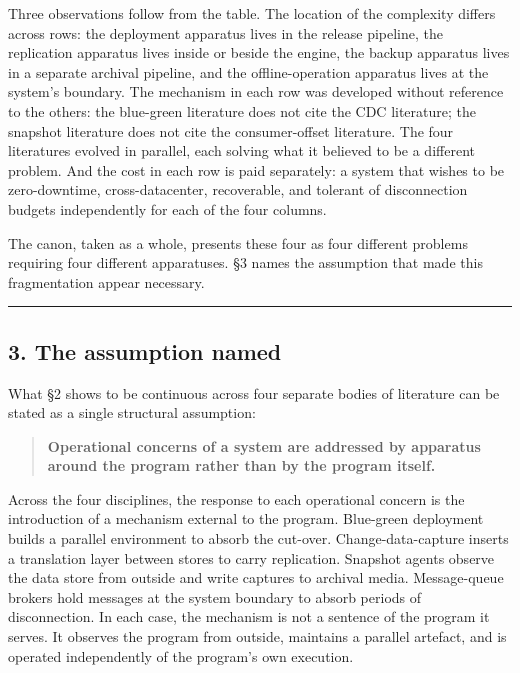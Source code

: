 \documentclass[
]{article}
\begin{document}
Three observations follow from the table. The location of the complexity
differs across rows: the deployment apparatus lives in the release
pipeline, the replication apparatus lives inside or beside the engine,
the backup apparatus lives in a separate archival pipeline, and the
offline-operation apparatus lives at the system's boundary. The
mechanism in each row was developed without reference to the others: the
blue-green literature does not cite the CDC literature; the snapshot
literature does not cite the consumer-offset literature. The four
literatures evolved in parallel, each solving what it believed to be a
different problem. And the cost in each row is paid separately: a system
that wishes to be zero-downtime, cross-datacenter, recoverable, and
tolerant of disconnection budgets independently for each of the four
columns.

The canon, taken as a whole, presents these four as four different
problems requiring four different apparatuses. §3 names the assumption
that made this fragmentation appear necessary.

\begin{center}\rule{0.5\linewidth}{0.5pt}\end{center}

\subsection{3. The assumption named}\label{the-assumption-named}

What §2 shows to be continuous across four separate bodies of literature
can be stated as a single structural assumption:

\begin{quote}
\textbf{Operational concerns of a system are addressed by apparatus
around the program rather than by the program itself.}
\end{quote}

Across the four disciplines, the response to each operational concern is
the introduction of a mechanism external to the program. Blue-green
deployment builds a parallel environment to absorb the cut-over.
Change-data-capture inserts a translation layer between stores to carry
replication. Snapshot agents observe the data store from outside and
write captures to archival media. Message-queue brokers hold messages at
the system boundary to absorb periods of disconnection. In each case,
the mechanism is not a sentence of the program it serves. It observes
the program from outside, maintains a parallel artefact, and is operated
independently of the program's own execution.
\end{document}
